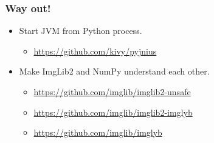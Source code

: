 \documentclass[%
]{beamer}
\newcommand{\cmark}{\ding{51}}%
\newcommand{\urlScrSz}[1]{\scriptsize\url{#1}}
\begin{document}
\begin{frame}
    \frametitle{Way out!}
    \begin{itemize}
        \setlength{\itemindent}{-0.5cm}
          \item<1->[\only<1->{\color{green}\cmark}] Start JVM from Python process.
        \begin{itemize}
        \setlength{\itemindent}{-1.0cm}
            \setlength\itemsep{1em}
              \item<1->[] \urlScrSz{https://github.com/kivy/pyjnius}
        \end{itemize}
          \item<2->[\only<3->{\color{green}\cmark}] Make ImgLib2 and NumPy understand each other.
        \begin{itemize}
            \setlength{\itemindent}{-1.0cm}
              \item<3->[] \urlScrSz{https://github.com/imglib/imglib2-unsafe}
              \item<4->[] \urlScrSz{https://github.com/imglib/imglib2-imglyb}
              \item<5->[] \urlScrSz{https://github.com/imglib/imglyb}
        \end{itemize}
    \end{itemize}
\end{frame}
\end{document}

